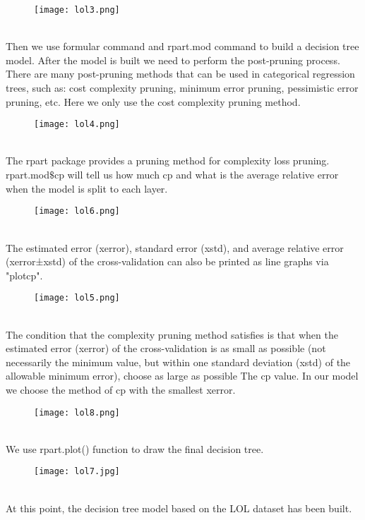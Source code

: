 \documentclass[a4paper,fleqn]{cas-sc}
\begin{document}
\begin{figure}[h!]
	\centering
		\texttt{[image: lol3.png]}
	\caption{}
	\label{FIG:1}
\end{figure}\\
Then we use formular command and rpart.mod command to build a decision tree model. After the model is built we need to perform the post-pruning process. There are many post-pruning methods that can be used in categorical regression trees, such as: cost complexity pruning, minimum error pruning, pessimistic error pruning, etc. Here we only use the cost complexity pruning method.\\
\begin{figure}[h!]
	\centering
		\texttt{[image: lol4.png]}
	\caption{}
	\label{FIG:1}
\end{figure}\\
The rpart package provides a pruning method for complexity loss pruning. rpart.mod$\$ $cp will tell us how much cp and what is the average relative error when the model is split to each layer. 
\begin{figure}[h!]
	\centering
		\texttt{[image: lol6.png]}
	\caption{}
	\label{FIG:1}
\end{figure}\\
The estimated error (xerror), standard error (xstd), and average relative error (xerror±xstd) of the cross-validation can also be printed as line graphs via "plotcp".\\
\begin{figure}[h!]
	\centering
		\texttt{[image: lol5.png]}
	\caption{}
	\label{FIG:1}
\end{figure}\\
The condition that the complexity pruning method satisfies is that when the estimated error (xerror) of the cross-validation is as small as possible (not necessarily the minimum value, but within one standard deviation (xstd) of the allowable minimum error), choose as large as possible The cp value. In our model we  choose the method of cp with the smallest xerror.\\
\begin{figure}[h!]
	\centering
		\texttt{[image: lol8.png]}
	\caption{}
	\label{FIG:1}
\end{figure}\\
We use rpart.plot() function to draw the final decision tree.\\
\begin{figure}[h!]
	\centering
		\texttt{[image: lol7.jpg]}
	\caption{}
	\label{FIG:1}
\end{figure}\\
At this point, the decision tree model based on the LOL dataset has been built.\\
\end{document}

